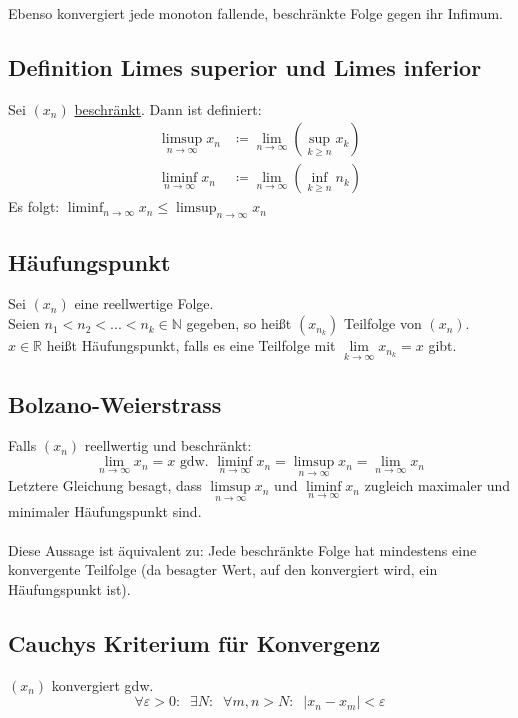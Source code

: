 \documentclass[halfparscip]{scrartcl}
\newcounter{subsection2}
\begin{document}
\noindent Ebenso konvergiert jede monoton fallende, beschränkte Folge gegen ihr Infimum.

\subsection*{Definition Limes superior und Limes inferior}
Sei $(x_n)$ \underline{beschränkt}.
Dann ist definiert:
\begin{align*}
	\limsup_{n \rightarrow \infty} x_n &\coloneqq \lim_{n \rightarrow \infty} (\sup_{k \geq n} x_k) \\
	\liminf_{n \rightarrow \infty} x_n &\coloneqq \lim_{n \rightarrow \infty} (\inf_{k \geq n} n_k)
\end{align*}
Es folgt: $\displaystyle\liminf_{n \rightarrow \infty} x_n  \leq \limsup_{n \rightarrow \infty} x_n$

\subsection{Häufungspunkt}
Sei $(x_n)$ eine reellwertige Folge. \\
Seien $n_1 < n_2 < ... < n_k \in \mathbb{N}$ gegeben, so heißt $(x_{n_k})$ Teilfolge von $(x_n)$.\\
$x \in \mathbb{R}$ heißt Häufungspunkt, falls es eine Teilfolge mit $\lim\limits_{k \rightarrow \infty} x_{n_k} = x$ gibt.

\subsection{Bolzano-Weierstrass}
Falls $(x_n)$ reellwertig und beschränkt:
\begin{equation*}
	\lim_{n \rightarrow \infty} x_n = x \text{ gdw. } \liminf_{n \rightarrow \infty} x_n = \limsup_{n \rightarrow \infty} x_n = \lim_{n \rightarrow \infty} x_n
\end{equation*}
Letztere Gleichung besagt, dass $\limsup\limits_{n \rightarrow \infty} x_n$ und $\liminf\limits_{n \rightarrow \infty} x_n$ zugleich maximaler und minimaler Häufungspunkt sind.\\\\
Diese Aussage ist äquivalent zu: Jede beschränkte Folge hat mindestens eine konvergente Teilfolge (da besagter Wert, auf den konvergiert wird, ein Häufungspunkt ist).

\subsection{Cauchys Kriterium für Konvergenz}
$(x_n)$ konvergiert gdw. 
\begin{equation*}
	\forall \varepsilon > 0:\;\; \exists N : \;\; \forall m,n > N: \;\; \vert x_n - x_m\vert < \varepsilon
\end{equation*}
\end{document}
